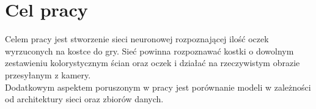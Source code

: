 
\chapter{Cel pracy}

Celem pracy jest stworzenie sieci neuronowej rozpoznającej ilość oczek wyrzuconych
na kostce do gry. Sieć powinna rozpoznawać kostki o dowolnym zestawieniu kolorystycznym
ścian oraz oczek i działać na rzeczywistym obrazie przesyłanym z kamery.\\
Dodatkowym aspektem poruszonym w pracy jest porównanie modeli w zależności od
architektury sieci oraz zbiorów danych.
